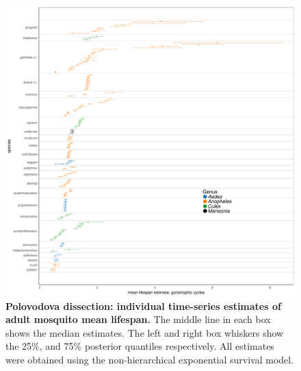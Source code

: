 \documentclass[12pt]{article}
\begin{document}
\begin{figure}[h]
	\centerline{\includegraphics[width=1.3\textwidth]{./Figure_files/dissection_individualEstimates_allSpecies.pdf}}
	\caption{\textbf{Polovodova dissection: individual time-series estimates of adult mosquito mean lifespan.} The middle line in each box shows the median estimates. The left and right box whiskers show the 25\%, and 75\% posterior quantiles respectively. All estimates were obtained using the non-hierarchical exponential survival model.}
	\label{fig:dissection_individualEstimates_allSpecies}
\end{figure}
\end{document}
